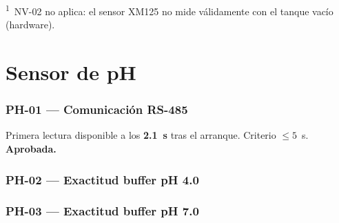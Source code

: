 \noindent\textsuperscript{1}~NV-02 no aplica: el sensor XM125 no mide válidamente con
el tanque vacío (hardware). 

\section{Sensor de pH}

\subsubsection*{PH-01 --- Comunicación RS-485}

Primera lectura disponible a los \textbf{2.1~s} tras el arranque.
Criterio $\leq 5$~s. \textbf{Aprobada.}

\subsubsection*{PH-02 --- Exactitud buffer pH 4.0}

\begin{table}[H]
\centering
\caption{Lecturas del sensor en buffer pH 4.0.}
\label{tab:ph02}
\renewcommand{\arraystretch}{1.3}\small
{}
\end{table}

\subsubsection*{PH-03 --- Exactitud buffer pH 7.0}

